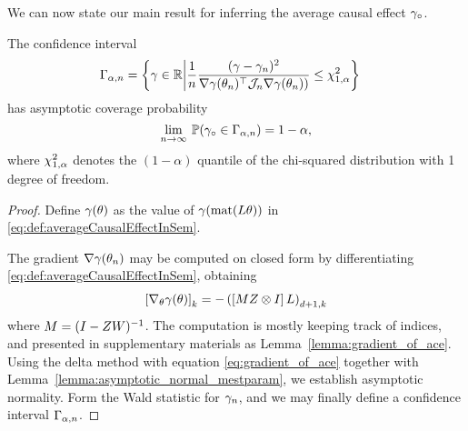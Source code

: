 We can now state our main result for inferring the average causal effect $\gamma_\circ$.
\begin{theorem}
    \label{thm:cofidence_interval_for_ace}
    The confidence interval
    \begin{align}
        \label{eq:confidence_set_for_ace}
        \Gamma_{\alpha, n}  = \left\{ \gamma \in \mathbb R \middle|\frac{1}{n} \frac{ (\gamma - \gamma_n)^2}{  \nabla \gamma(\theta_n)^\top\mathcal J_n \nabla \gamma(\theta_n))}  \leq \chi^2_{1,\alpha}  \right\}
        \quad
    \end{align}
    has asymptotic coverage probability
    \begin{equation}
        \lim_{n \rightarrow \infty} \: \mathbb{P} ( \gamma_\circ \in  \Gamma_{\alpha, n}  ) = 1 - \alpha,
    \end{equation}
    where $\chi^2_{1,\alpha}$ denotes the $(1-\alpha)$ quantile of the chi-squared distribution with 1 degree of freedom.
    \label{thm:confidence_set_for_ace}
\end{theorem}
\begin{proof}

    Define $\gamma(\theta)$ as the value of $\gamma(\operatorname*{mat}(L \theta))$ in \eqref{eq:def:averageCausalEffectInSem}.

    The gradient $\nabla \gamma(\theta_n)$ may be computed on closed form by differentiating \eqref{eq:def:averageCausalEffectInSem}, obtaining
    \begin{align}
        \label{eq:gradient_of_ace}
        \left[ \nabla _\theta \gamma(\theta) \right]_k = -\left( \left[M Z \otimes I \right] L \right)_{d+1,k}
    \end{align}
    where $M = (I-Z W)^{-1}$. The computation is mostly keeping track of indices, and presented in supplementary materials as Lemma~\ref{lemma:gradient_of_ace}.
    Using the delta method with equation \eqref{eq:gradient_of_ace} together with Lemma~\ref{lemma:asymptotic_normal_mestparam}, we establish asymptotic normality. Form the Wald statistic for $\gamma_n$, and we may finally define a confidence interval $\Gamma_{\alpha, n}$.
\end{proof}


